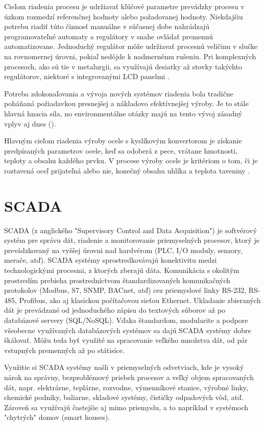 \documentclass[]{tukediphc}
\begin{document}
Cieľom riadenia procesu je udržiavať kľúčové parametre prevádzky procesu v úzkom rozmedzí referenčnej hodnoty alebo požadovanej hodnoty. Niekdajšiu potrebu riadiť túto činnosť manuálne v súčasnej dobe nahrádzajú programovateľné automaty a regulátory v snahe ovládať premennú automatizovane. Jednoduchý regulátor môže udržiavať procesnú veličinu v slučke na rovnomernej úrovni, pokiaľ nedôjde k nadmernému rušeniu. Pri komplexných procesoch, ako sú tie v metalurgii, sa využívajú desiatky až stovky takýchto regulátorov, niektoré s integrovanými LCD panelmi \citep{Al-Megren2016}.

Potreba zdokonaľovania a vývoja nových systémov riadenia bola tradične poháňaná požiadavkou presnejšej a nákladovo efektívnejšej výroby. Je to stále hlavná hnacia sila, no environmentálne otázky majú na tento vývoj zásadný vplyv aj dnes (\cite{Widlund1998}).

Hlavným cieľom riadenia výroby ocele s kyslíkovým konvertorom je získanie predpísaných parametrov ocele, keď sa odoberá z pece, vrátane hmotnosti, teploty a obsahu každého prvku. V procese výroby ocele je kritériom o tom, či je roztavená oceľ prijateľná alebo nie, konečný obsahu uhlíka a teplota taveniny \cite{Wang2010}.



\section{SCADA}

SCADA (z anglického "Supervisory Control and Data Acquisition") je softvérový systém pre správu dát, riadenie a monitorovanie priemyselných procesov, ktorý je prevádzkovaný na vyššej úrovni nad hardvérom (PLC, I/O moduly, senzory, merače, atď). SCADA systémy sprostredkovávajú konektivitu medzi technologickými procesmi, z ktorých zberajú dáta. Komunikácia s okolitým prostredím prebieha prostredníctvom štandardizovaných komunikačných protokolov (Modbus, S7, SNMP, BACnet, atď) cez priemyslové linky RS-232, RS-485, Profibus, ako aj klasickou počítačovou sieťou Ethernet. Ukladanie zbieraných dát je prevádzané od jednoduchého zápisu do textových súborov až po databázové servery (SQL/NoSQL). Vďaka štandardom, modularite a podpore všeobecne využívaných databázových systémov sa dajú SCADA systémy dobre škálovať. Môžu teda byť využíté na spracovanie veľkého množstva dát, od pár vstupných premenných až po státisíce.

Využitie si SCADA systémy našli v priemyselných odvetviach, kde je vysoký nárok na správny, bezproblémový priebeh procesov a veľký objem spracovaných dát, napr. elektrárne, teplárne, rozvodne, výmenníkové stanice, výrobné linky, chemické podniky, baliarne, skladové systémy, čističky odpadových vôd, atď. Zároveň sa využívajú častejšie aj mimo priemyslu, a to napríklad v systémoch "chytrých" domov (smart houses).
\end{document}
